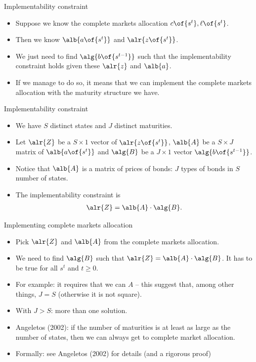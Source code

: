 \documentclass[11pt,xcolor={dvipsnames},aspectratio=159,hyperref={pdftex,pdfpagemode=UseNone,hidelinks,pdfdisplaydoctitle=true},usepdftitle=false]{beamer}
\begin{document}
\begin{frame}{Implementability constraint}
    \begin{itemize}
        \item Suppose we know the complete markets allocation $c\of{s^t},\ell\of{s^t}$. 
        \item Then we know $\alb{a\of{s^t}}$ and $\alr{z\of{s^t}}$.
        \item We just need to find $\alg{b\of{s^{t-1}}}$ such that the implementability constraint holds given these $\alr{z}$ and $\alb{a}$.
        \item If we manage to do so, it means that we can implement the complete markets allocation with the maturity structure we have.
     \end{itemize}
\end{frame}

\begin{frame}{Implementability constraint}
    \begin{itemize}
        \item We have $S$ distinct states and $J$ distinct maturities.
        \item Let $\alr{Z}$ be a $S \times 1$ vector of $\alr{z\of{s^t}}$, $\alb{A}$ be a $S \times J$ matrix of $\alb{a\of{s^t}}$ and $\alg{B}$ be a $J \times 1$ vector $\alg{b\of{s^{t-1}}}$.
        \item Notice that $\alb{A}$ is a matrix of prices of bonds: $J$ types of bonds in $S$ number of states.
        \item The implementability constraint is \begin{align*} \alr{Z} = \alb{A} \cdot \alg{B}.\end{align*}
    \end{itemize}
\end{frame}

\begin{frame}{Implementing complete markets allocation}
    \begin{itemize}
        \item Pick $\alr{Z}$ and $\alb{A}$ from the complete markets allocation. 
            \item We need to find $\alg{B}$ such that $\alr{Z} = \alb{A} \cdot \alg{B}$. It has to be true for all $s^t$ and $t\geq 0$.
        \item For example: it requires that we can  $A$ -- this suggest that, among other things, $J = S$ (otherwise it is not square).
        \item With $J>S$: more than one solution. 
        \item Angeletos (2002): if the number of maturities is at least as large as the number of states, then we can always get  to complete
        market allocation.
        \item Formally: see Angeletos (2002) for details (and a rigorous proof)

    \end{itemize}
\end{frame}
\end{document}

